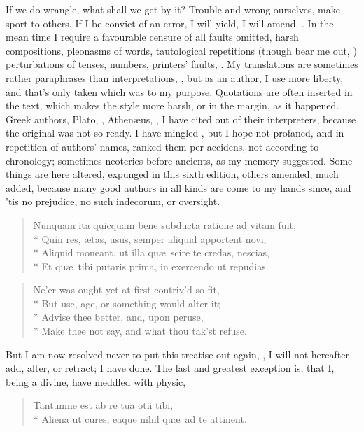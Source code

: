 {If we do wrangle, what shall we get by it? Trouble and wrong ourselves,
make sport to others. If I be convict of an error, I will yield, I will
amend. . In the mean
time I require a favourable censure of all faults omitted, harsh
compositions, pleonasms of words, tautological repetitions (though
\Seneca bear me out, )
perturbations of tenses, numbers, printers' faults, \etc. My translations
are sometimes rather paraphrases than interpretations, ,
but as an author, I use more liberty, and that's only taken which was
to my purpose. Quotations are often inserted in the text, which makes
the style more harsh, or in the margin, as it happened. Greek authors,
Plato, , Athen\ae{}us, \etc, I have cited out of their
interpreters, because the original was not so ready. I have mingled
, but I hope not profaned, and in repetition of authors'
names, ranked them per accidens, not according to chronology; sometimes
neoterics before ancients, as my memory suggested. Some things are here
altered, expunged in this sixth edition, others amended, much added,
because many good authors in all kinds are come to my hands since,
and 'tis no prejudice, no such indecorum, or oversight.
%
\begin{latin}
\settowidth{\versewidth}{Nunquam ita quicquam bene subducta ratione ad vitam fuit,}
\begin{verse}
Nunquam ita quicquam bene subducta ratione ad vitam fuit,\\*
Quin res, \ae{}tas, usus, semper aliquid apportent novi,\\*
Aliquid moneant, ut illa qu\ae{}\ scire te credas, nescias,\\*
Et qu\ae{}\ tibi putaris prima, in exercendo ut repudias.
\end{verse}
\end{latin}
\translationrule
\begin{verse}
Ne'er was ought yet at first contriv'd so fit,\\*
But use, age, or something would alter it;\\*
Advise thee better, and, upon peruse,\\*
Make thee not say, and what thou tak'st refuse.
\end{verse}
%

But I am now resolved never to put this treatise out again, , I will not hereafter add, alter, or retract; I have done. The
last and greatest exception is, that I, being a divine, have meddled
with physic,
%
\begin{verse}
Tantumne est ab re tua otii tibi,\\*
Aliena ut cures, eaque nihil qu\ae{}\ ad te attinent.
\end{verse}
%

}

